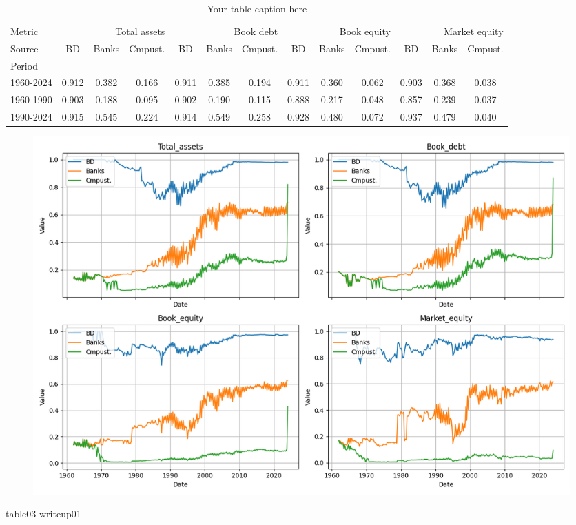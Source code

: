 \documentclass{article}
\begin{document}
\begin{adjustbox}{max width=\textwidth}

    \usepackage{booktabs} %
    \usepackage{graphicx} %
    \usepackage{adjustbox} %

    \begin{table}[htbp]
      \centering
      \caption{Your table caption here}
      \label{tab:yourlabel}
      \begin{adjustbox}{max width=\textwidth}
      \small
      \begin{tabular}{lcccccccccccc}
\toprule
Metric & \multicolumn{3}{r}{Total assets} & \multicolumn{3}{r}{Book debt} & \multicolumn{3}{r}{Book equity} & \multicolumn{3}{r}{Market equity} \\
Source & BD & Banks & Cmpust. & BD & Banks & Cmpust. & BD & Banks & Cmpust. & BD & Banks & Cmpust. \\
Period &  &  &  &  &  &  &  &  &  &  &  &  \\
\midrule
1960-2024 & 0.912 & 0.382 & 0.166 & 0.911 & 0.385 & 0.194 & 0.911 & 0.360 & 0.062 & 0.903 & 0.368 & 0.038 \\
1960-1990 & 0.903 & 0.188 & 0.095 & 0.902 & 0.190 & 0.115 & 0.888 & 0.217 & 0.048 & 0.857 & 0.239 & 0.037 \\
1990-2024 & 0.915 & 0.545 & 0.224 & 0.914 & 0.549 & 0.258 & 0.928 & 0.480 & 0.072 & 0.937 & 0.479 & 0.040 \\
\bottomrule
\end{tabular}

      \end{adjustbox}
    \end{table}
    \end{adjustbox}

\begin{figure}[htbp]\centering\includegraphics[width=\linewidth]{updated_table02_figure.png}\caption{}\end{figure}\par
\par
table03 writeup01\par
\end{document}
